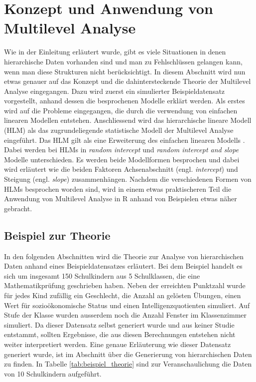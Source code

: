 \documentclass[12pt]{article}\usepackage[]{graphicx}\usepackage[]{color}
\numberwithin{equation}{section}
\begin{document}
\section{Konzept und Anwendung von Multilevel Analyse}
Wie in der Einleitung erläutert wurde, gibt es viele Situationen in denen hierarchische Daten vorhanden sind und man zu Fehlschlüssen gelangen kann, wenn man diese Strukturen nicht berücksichtigt. In diesem Abschnitt wird nun etwas genauer auf das Konzept und die dahintersteckende Theorie der Multilevel Analyse eingegangen. Dazu wird zuerst ein simulierter Beispieldatensatz vorgestellt, anhand dessen die besprochenen Modelle erklärt werden. Als erstes wird auf die Probleme eingegangen, die durch die verwendung von einfachen linearen Modellen entstehen. Anschliessend wird das hierarchische lineare Modell (HLM) als das zugrundeliegende statistische Modell der Multilevel Analyse eingeführt. Das HLM gilt als eine Erweiterung des einfachen linearen Modells \cite{SnijdersTomA.B2012Ma:a}. Dabei werden bei HLMs in \textit{random intercept} und \textit{random intercept and slope} Modelle unterschieden. Es werden beide Modellformen besprochen und dabei wird erläutert wie die beiden Faktoren Achsenabschnitt (engl. \textit{intercept}) und Steigung (engl. \textit{slope}) zusammenhängen. Nachdem die verschiedenen Formen von HLMs besprochen worden sind, wird in einem etwas praktischeren Teil die Anwendung von Multilevel Analyse in R anhand von Beispielen etwas näher gebracht.

\subsection{Beispiel zur Theorie} \label{section:bsp_theorie}
In den folgenden Abschnitten wird die Theorie zur Analyse von hierarchischen Daten anhand eines Beispieldatensatzes erläutert. Bei dem Beispiel handelt es sich um insgesamt 150 Schulkindern aus 5 Schulklassen, die eine Mathematikprüfung geschrieben haben. Neben der erreichten Punktzahl wurde für jedes Kind zufällig ein Geschlecht, die Anzahl an gelösten Übungen, einen Wert für sozioökonomische Status und einen Intelligenzquotienten simuliert. Auf Stufe der Klasse wurden ausserdem noch die Anzahl Fenster im Klassenzimmer simuliert. Da dieser Datensatz selbst generiert wurde und aus keiner Studie entstammt, sollten Ergebnisse, die aus diesen Berechnungen entstehen nicht weiter interpretiert werden. Eine genaue Erläuterung wie dieser Datensatz generiert wurde, ist im Abschnitt über die Generierung von hierarchischen Daten zu finden. In Tabelle \ref{tab:beispiel_theorie} sind zur Veranschaulichung die Daten von 10 Schulkindern aufgeführt.
\end{document}
